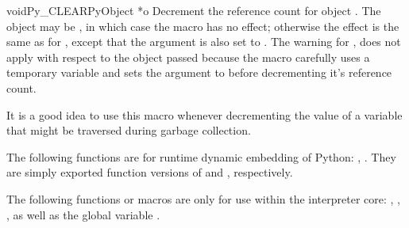 \begin{cfuncdesc}{void}{Py_CLEAR}{PyObject *o}
  Decrement the reference count for object .  The object may be
  \NULL, in which case the macro has no effect; otherwise the effect
  is the same as for , except that the argument
  is also set to \NULL.  The warning for , does
  not apply with respect to the object passed because the macro
  carefully uses a temporary variable and sets the argument to \NULL
  before decrementing it's reference count.

  It is a good idea to use this macro whenever decrementing the value
  of a variable that might be traversed during garbage collection.

\end{cfuncdesc}


The following functions are for runtime dynamic embedding of Python:
, .
They are simply exported function versions of  and 
, respectively.

The following functions or macros are only for use within the
interpreter core: ,
, , as
well as the global variable .
